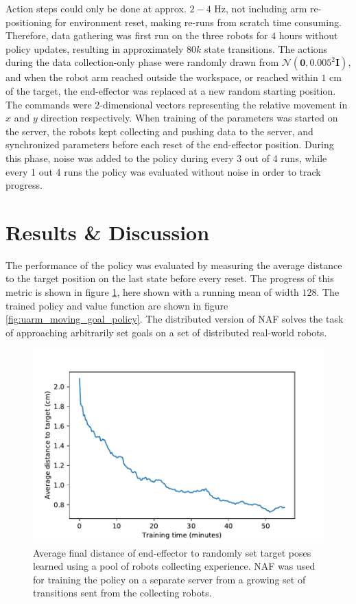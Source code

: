 Action steps could only be done at approx. $2-4$ Hz, not including arm
re-positioning for environment reset, making re-runs from scratch time
consuming. Therefore, data gathering was first run on the three robots for $4$
hours without policy updates, resulting in approximately $80k$ state
transitions. The actions during the data collection-only phase were randomly
drawn from $\mathcal{N}(\mathbf{0}, 0.005^2 \mathbf{I})$, and when the robot
arm reached outside the workspace, or reached within $1$ cm of the target, the
end-effector was replaced at a new random starting position. The commands were
2-dimensional vectors representing the relative movement in $x$ and $y$
direction respectively. When training of the parameters was started on the
server, the robots kept collecting and pushing data to the server, and
synchronized parameters before each reset of the end-effector position. During
this phase, noise was added to the policy during every 3 out of 4 runs, while
every 1 out 4 runs the policy was evaluated without noise in order to track
progress.

\section{Results \& Discussion}

The performance of the policy was evaluated by measuring the average distance
to the target position on the last state before every reset. The progress of
this metric is shown in figure \ref{fig:uarm_moving_goal_progress}, here shown
with a running mean of width $128$. The trained policy and value function are
shown in figure \ref{fig:uarm_moving_goal_policy}. The distributed version of
NAF solves the task of approaching arbitrarily set goals on a set of
distributed real-world robots.

\begin{figure}[h!]
    \centering
    \includegraphics[width=0.50 \textwidth]{res/uarm_moving_goal_progress.pdf}

    \caption{Average final distance of end-effector to randomly set target
    poses learned using a pool of robots collecting experience. NAF was used
    for training the policy on a separate server from a growing set of
    transitions sent from the collecting robots.}
    \label{fig:uarm_moving_goal_progress}
    
\end{figure}

